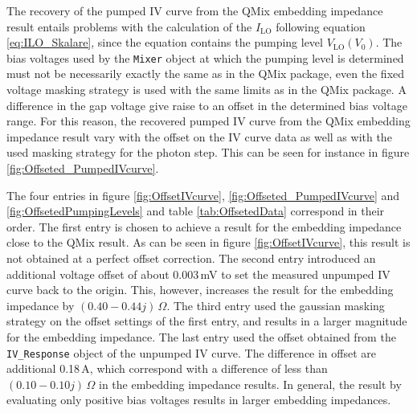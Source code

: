 \documentclass[]{article}
\begin{document}
The recovery of the pumped IV curve from the QMix embedding impedance result entails problems with the calculation of the $I_\text{LO}$ following equation \ref{eq:ILO_Skalare}, since the equation contains the pumping level $V_\text{LO}(V_0)$. The bias voltages used by the \texttt{Mixer} object at which the pumping level is determined must not be necessarily exactly the same as in the QMix package, even the fixed voltage masking strategy is used with the same limits as in the QMix package. A difference in the gap voltage give raise to an offset in the determined bias voltage range. For this reason, the recovered pumped IV curve from the QMix embedding impedance result vary with the offset on the IV curve data as well as with the used masking strategy for the photon step. This can be seen for instance in figure \ref{fig:Offseted_PumpedIVcurve}.

The four entries in figure \ref{fig:OffsetIVcurve}, \ref{fig:Offseted_PumpedIVcurve} and \ref{fig:OffsetedPumpingLevels} and table \ref{tab:OffsetedData} correspond in their order. The first entry is chosen to achieve a result for the embedding impedance close to the QMix result. As can be seen in figure \ref{fig:OffsetIVcurve}, this result is not obtained at a perfect offset correction. The second entry introduced an additional voltage offset of about 0.003\,mV to set the measured unpumped IV curve back to the origin. This, however, increases the result for the embedding impedance by $(0.40-0.44j)\,\Omega$. The third entry used the gaussian masking strategy on the offset settings of the first entry, and results in a larger magnitude for the embedding impedance. The last entry used the offset obtained from the \texttt{IV\_Response} object of the unpumped IV curve. The difference in offset are additional 0.18\,\textmu A, which correspond with a difference of less than $(0.10-0.10j)\,\Omega$ in the embedding impedance results. In general, the result by evaluating only positive bias voltages results in larger embedding impedances.
\end{document}
